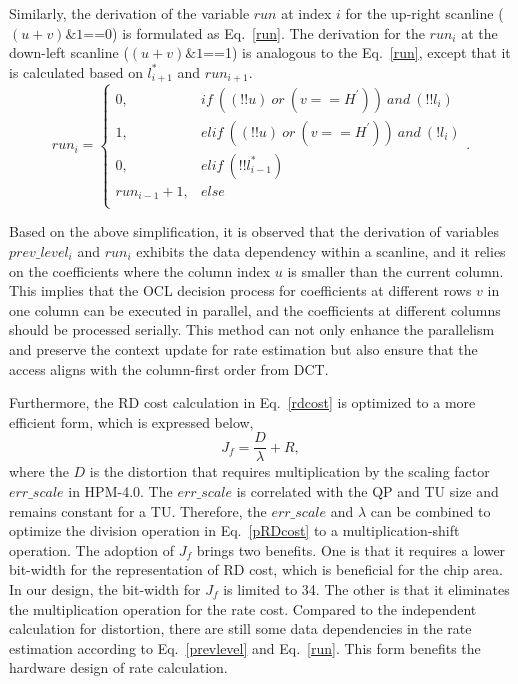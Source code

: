 \documentclass[lettersize,journal]{IEEEtran}
\begin{document}
Similarly, the derivation of the variable $run$ at index $i$ for the up-right scanline ($(u+v)\&1$==0) is formulated as Eq.~\eqref{run}. The derivation for the $run_{i}$ at the down-left scanline ($(u+v)\&1$==1) is analogous to the Eq.~\eqref{run}, except that it is calculated based on $l_{i+1}^{*}$ and $run_{i+1}$. 
\begin{equation}
	run_{i}=\begin{cases}
	\label{run}
	0,            & if \ ((!!u)\ or \ (v==H^{'}))\ and \ (!!l_{i}) \\
	1,            & elif \ ((!!u)\ or \ (v==H^{'}))\ and \ (!l_{i})\\
	0,            & elif \  (!!l_{i-1}^{*})\\
	run_{i-1}+1,  & else  \\
\end{cases} .
\end{equation}

Based on the above simplification, it is observed that the derivation of variables $prev\_level_{i}$ and $run_{i}$ exhibits the data dependency within a scanline, and it relies on the coefficients where the column index $u$ is smaller than the current column. This implies that the OCL decision process for coefficients at different rows $v$ in one column can be executed in parallel, and the coefficients at different columns should be processed serially. This method can not only enhance the parallelism and preserve the context update for rate estimation but also ensure that the access aligns with the column-first order from DCT. 

Furthermore, the RD cost calculation in Eq.~\eqref{rdcost} is optimized to a more efficient form, which is expressed below, 
\begin{equation}
    J_{f} =\frac{D}{\lambda } + R,
	\label{pRDcost}
\end{equation}
where the $D$ is the distortion that requires multiplication by the scaling factor $err\_scale$ in HPM-4.0. The $err\_scale$ is correlated with the QP and TU size and remains constant for a TU. Therefore, the $err\_scale$ and $\lambda$ can be combined to optimize the division operation in Eq.~\eqref{pRDcost} to a multiplication-shift operation. The adoption of $J_{f}$ brings two benefits. One is that it requires a lower bit-width for the representation of RD cost, which is beneficial for the chip area. In our design, the bit-width for $J_{f}$ is limited to 34. The other is that it eliminates the multiplication operation for the rate cost. Compared to the independent calculation for distortion, there are still some data dependencies in the rate estimation according to Eq.~\eqref{prevlevel} and Eq.~\eqref{run}. This form benefits the hardware design of rate calculation. 
\end{document}

